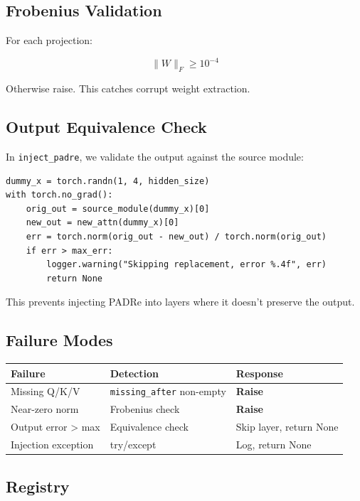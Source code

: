 \subsection{Frobenius Validation}

For each projection:

\[
\|W\|_F \geq 10^{-4}
\tag{5.1}
\]

Otherwise raise. This catches corrupt weight extraction.

\subsection{Output Equivalence Check}

In \texttt{inject\_padre}, we validate the output against the source module:

\begin{lstlisting}
dummy_x = torch.randn(1, 4, hidden_size)
with torch.no_grad():
    orig_out = source_module(dummy_x)[0]
    new_out = new_attn(dummy_x)[0]
    err = torch.norm(orig_out - new_out) / torch.norm(orig_out)
    if err > max_err:
        logger.warning("Skipping replacement, error %.4f", err)
        return None
\end{lstlisting}

This prevents injecting PADRe into layers where it doesn't preserve the 
output.

\subsection{Failure Modes}

\begin{table}[H]
\centering
\small
\begin{tabular}{lll}
\toprule
\textbf{Failure} & \textbf{Detection} & \textbf{Response} \\
\midrule
Missing Q/K/V & \texttt{missing\_after} non-empty & \textbf{Raise} \\
Near-zero norm & Frobenius check & \textbf{Raise} \\
Output error > max & Equivalence check & Skip layer, return None \\
Injection exception & try/except & Log, return None \\
\bottomrule
\end{tabular}
\end{table}

\subsection{Registry}

